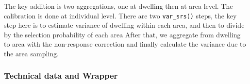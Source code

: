 \documentclass[
]{article}
\newenvironment{Shaded}{\begin{snugshade}}{\end{snugshade}}
\newcommand{\AttributeTok}[1]{\textcolor[rgb]{0.13,0.29,0.53}{#1}}
\newcommand{\ConstantTok}[1]{\textcolor[rgb]{0.56,0.35,0.01}{#1}}
\newcommand{\FunctionTok}[1]{\textcolor[rgb]{0.13,0.29,0.53}{\textbf{#1}}}
\newcommand{\NormalTok}[1]{#1}
\newcommand{\OtherTok}[1]{\textcolor[rgb]{0.56,0.35,0.01}{#1}}
\newcommand{\SpecialCharTok}[1]{\textcolor[rgb]{0.81,0.36,0.00}{\textbf{#1}}}
\newcommand{\StringTok}[1]{\textcolor[rgb]{0.31,0.60,0.02}{#1}}
\begin{document}
\begin{Shaded}
\end{Shaded}

The key addition is two aggregations, one at dwelling then at area
level. The calibration is done at individual level. There are two
\texttt{var\_srs()} steps, the key step here is to estimate variance of
dwelling within each area, and then to divide by the selection
probability of each area After that, we aggregate from dwelling to area
with the non-response correction and finally calculate the variance due
to the area sampling.

\subsubsection{Technical data and
Wrapper}\label{technical-data-and-wrapper}
\end{document}
